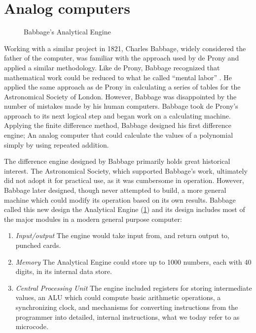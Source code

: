 \documentclass[../main.tex]{subfiles}
\begin{document}

\section{Analog computers}

\begin{figure}[ht]
    \caption[Babbage's Analytical Engine]{Babbage's Analytical Engine \cite{diffengine}}
    \label{fig:engine}
\end{figure}

Working with a similar project in 1821, Charles Babbage, widely considered the father of the computer, was familiar with the approach used by de Prony and applied a similar methodology.
Like de Prony, Babbage recognized that mathematical work could be reduced to what he called ``mental labor'' \cite{babbage1832}.
He applied the same approach as de Prony in calculating a series of tables for the Astronomical Society of London.
However, Babbage was disappointed by the number of mistakes made by his human computers.
Babbage took de Prony's approach to its next logical step and began work on a calculating machine.
Applying the finite difference method, Babbage designed his first difference engine; An analog computer that could calculate the values of a polynomial simply by using repeated addition.

The difference engine designed by Babbage primarily holds great historical interest.
The Astronomical Society, which supported Babbage's work, ultimately did not adopt it for practical use, as it was cumbersome in operation.
However, Babbage later designed, though never attempted to build, a more general machine which could modify its operation based on its own results.
Babbage called this new design the Analytical Engine (\cref{fig:engine}) and its design includes most of the major modules in a modern general purpose computer:

\begin{enumerate}
  \item \textit{Input/output} The engine would take input from, and return output to, punched cards.
  \item \textit{Memory} The Analytical Engine could store up to 1000 numbers, each with 40 digits, in its internal data store.
  \item \textit{Central Processing Unit} The engine included registers for storing intermediate values, an ALU which could compute basic arithmetic operations, a synchronizing clock,
      and mechanisms for converting instructions from the programmer into detailed, internal instructions, what we today refer to as microcode.
\end{enumerate}
\end{document}
